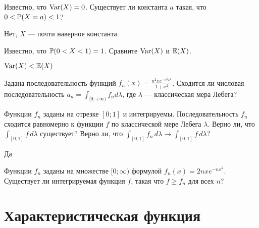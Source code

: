\begin{problem}
Известно, что $\Var(X)=0$. Существует ли константа $a$ такая, что $0<\P(X=a)<1$?

\begin{sol}
Нет, $X$ — почти наверное константа.
\end{sol}
\end{problem}

\begin{problem}
Известно, что $\P(0<X<1)=1$. Сравните $\Var(X)$ и $\E(X)$.

\begin{sol}
$\Var(X)<\E(X)$
\end{sol}
\end{problem}

\begin{problem}
Задана последовательность функций $f_n(x)=\frac{n^2 x e^{-n^2 x^2}}{1+x^2}$. Сходится ли числовая последовательность $a_n=\int_{[0;+\infty)}f_n d\lambda$, где $\lambda$ — классическая мера Лебега?

\begin{sol}

\end{sol}
\end{problem}

\begin{problem}
Функции $f_n$ заданы на отрезке $[0;1]$ и интегрируемы. Последовательность $f_n$ сходится равномерно к функции $f$ по классической мере Лебега $\lambda$. Верно ли, что $\int_{[0;1]} f\,d\lambda$ существует? Верно ли, что $\int_{[0;1]} f_n\,d\lambda\to \int_{[0;1]} f\,d\lambda$?

\begin{sol}
Да
\end{sol}
\end{problem}

\begin{problem}
Функции $f_n$ заданы на множестве $[0;\infty)$ формулой $f_n(x)=2nxe^{-nx^2}$. Существует ли  интегрируемая функция $f$, такая что $f\geq f_n$ для всех $n$?

\begin{sol}
\end{sol}
\end{problem}


\section{Характеристическая функция}

